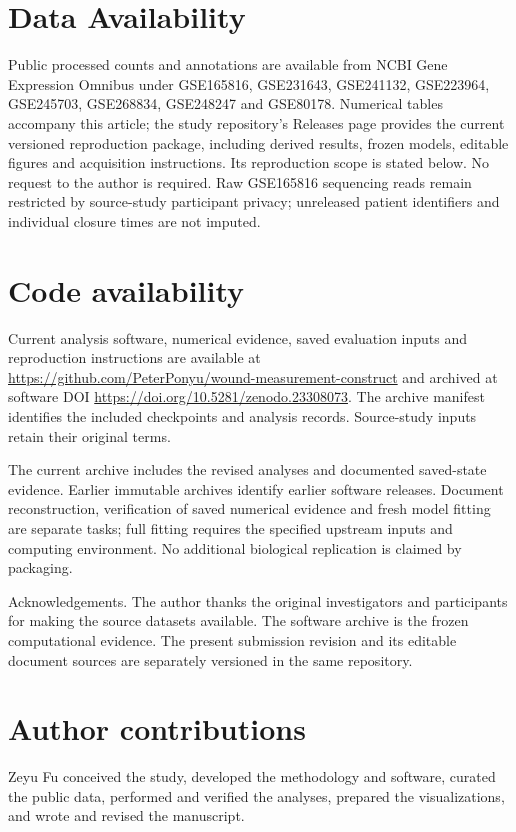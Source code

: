 \documentclass[10pt,a4paper]{article}
\begin{document}
\section*{Data Availability}
Public processed counts and annotations are available from NCBI Gene Expression Omnibus under GSE165816, GSE231643, GSE241132, GSE223964, GSE245703, GSE268834, GSE248247 and GSE80178. Numerical tables accompany this article; the study repository's Releases page provides the current versioned reproduction package, including derived results, frozen models, editable figures and acquisition instructions. Its reproduction scope is stated below. No request to the author is required. Raw GSE165816 sequencing reads remain restricted by source-study participant privacy; unreleased patient identifiers and individual closure times are not imputed.

\section*{Code availability}
Current analysis software, numerical evidence, saved evaluation inputs and reproduction instructions are available at \url{https://github.com/PeterPonyu/wound-measurement-construct} and archived at software DOI \url{https://doi.org/10.5281/zenodo.23308073}. The archive manifest identifies the included checkpoints and analysis records. Source-study inputs retain their original terms.

The current archive includes the revised analyses and documented saved-state evidence. Earlier immutable archives identify earlier software releases. Document reconstruction, verification of saved numerical evidence and fresh model fitting are separate tasks; full fitting requires the specified upstream inputs and computing environment. No additional biological replication is claimed by packaging.

Acknowledgements. The author thanks the original investigators and participants for making the source datasets available.
\FloatBarrier
The software archive is the frozen computational evidence. The present submission revision and its editable document sources are separately versioned in the same repository.




\section*{Author contributions}
Zeyu Fu conceived the study, developed the methodology and software, curated the public data, performed and verified the analyses, prepared the visualizations, and wrote and revised the manuscript.
\end{document}
